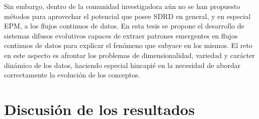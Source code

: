 \documentclass[c5paper,10pt,twoside]{book}	   	%
\begin{document}
Sin embargo, dentro de la comunidad investigadora aún no se han propuesto métodos para aprovechar el potencial que posee \ac{SDRD} en general, y en especial \ac{EPM}, a los flujos continuos de datos. En esta tesis se propone el desarrollo de sistemas difusos evolutivos capaces de extraer patrones emergentes en flujos continuos de datos para explicar el fenómeno que subyace en los mismos. El reto en este aspecto es afrontar los problemas de dimensionalidad, variedad y carácter dinámico de los datos, haciendo especial hincapié en la necesidad de abordar correctamente la evolución de los conceptos.

\clearpage{} \cleardoublepage
\clearpage{}
\chapter{Discusión de los resultados} \label{chap:discusion}
\end{document}
